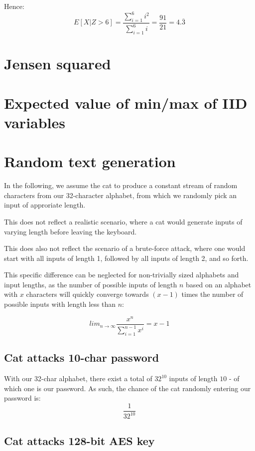 \documentclass[a4paper]{scrreprt}
\begin{document}
Hence:
\[
	E[X | Z > 6] = \frac{\sum_{i=1}^6{i^2}}{\sum_{i=1}^6{i}} = \frac{91}{21} = 4.\overline{3}
\]

\section{Jensen squared}

\section{Expected value of min/max of IID variables}

\section{Random text generation}

In the following, we assume the cat to produce a constant stream of random
characters from our 32-character alphabet, from which we randomly pick an input
of approriate length.

This does not reflect a realistic scenario, where a cat would generate inputs
of varying length before leaving the keyboard.

This does also not reflect the scenario of a brute-force attack, where one
would start with all inputs of length 1, followed by all inputs of length 2,
and so forth.

This specific difference can be neglected for non-trivially sized alphabets and
input lengths, as the number of possible inputs of length $n$ based on an
alphabet with $x$ characters will quickly converge towards $(x - 1)$ times the
number of possible inputs with length less than $n$:

\[
	lim_{n\to\infty} \frac{x^n}{\sum_{i=1}^{n-1}{x^i}} = x-1
\]

\subsection{Cat attacks 10-char password}

With our 32-char alphabet, there exist a total of $32^{10}$ inputs of length $10$
- of which one is our password. As such, the chance of the cat randomly entering our password is:
\[
	\frac{1}{32^{10}}
\]

\subsection{Cat attacks 128-bit AES key}
\end{document}
